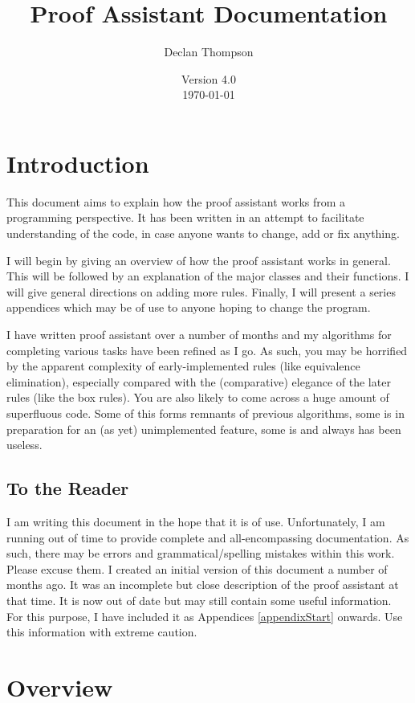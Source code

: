 \documentclass[a4paper]{article}
\title{Proof Assistant Documentation}
\author{Declan Thompson}
\date{Version 4.0\\
			\today}
\begin{document}
\maketitle

\tableofcontents

\section{Introduction}
This document aims to explain how the proof assistant works from a programming perspective. It has been written in an attempt to facilitate understanding of the code, in case anyone wants to change, add or fix anything.

I will begin by giving an overview of how the proof assistant works in general. This will be followed by an explanation of the major classes and their functions. I will give general directions on adding more rules. Finally, I will present a series appendices which may be of use to anyone hoping to change the program.

I have written proof assistant over a number of months and my algorithms for completing various tasks have been refined as I go. As such, you may be horrified by the apparent complexity of early-implemented rules (like equivalence elimination), especially compared with the (comparative) elegance of the later rules (like the box rules). You are also likely to come across a huge amount of superfluous code. Some of this forms remnants of previous algorithms, some is in preparation for an (as yet) unimplemented feature, some is and always has been useless.

\subsection{To the Reader}
I am writing this document in the hope that it is of use. Unfortunately, I am running out of time to provide complete and all-encompassing documentation. As such, there may be errors and grammatical/spelling mistakes within this work. Please excuse them. I created an initial version of this document a number of months ago. It was an incomplete but close description of the proof assistant at that time. It is now out of date but may still contain some useful information. For this purpose, I have included it as Appendices \ref{appendixStart} onwards. Use this information with extreme caution.


\section{Overview}
\end{document}
